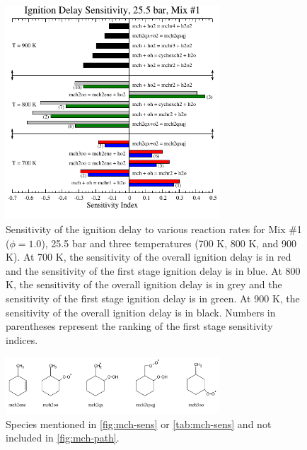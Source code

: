\documentclass[12pt, letterpaper]{article}
\begin{document}
\begin{figure}
    \centering
    \includegraphics[angle=-90, width=8cm]{../figures/05-MCH/mch-sens}
    \caption{Sensitivity of the ignition delay to various reaction rates 
        for Mix \#1 ($\phi=1.0$), 25.5 bar and three temperatures (700 K, 
        800 K, and 900 K). At 700 K, the sensitivity of the overall 
        ignition delay is in red and the sensitivity of the first stage 
        ignition delay is in blue. At 800 K, the sensitivity of the overall 
        ignition delay is in grey and the sensitivity of the first stage 
        ignition delay is in green. At 900 K, the sensitivity of the overall 
        ignition delay is in black. Numbers in parentheses represent the 
        ranking of the first stage sensitivity indices.}
    \label{fig:mch-sens}
\end{figure}
\begin{figure}
    \centering
    \includegraphics[width=8cm]{../figures/05-MCH/mch-species}
    \caption{Species mentioned in \autoref{fig:mch-sens} or 
        \autoref{tab:mch-sens} and not included in \autoref{fig:mch-path}.}
    \label{fig:mch-species}
\end{figure}
\end{document}
